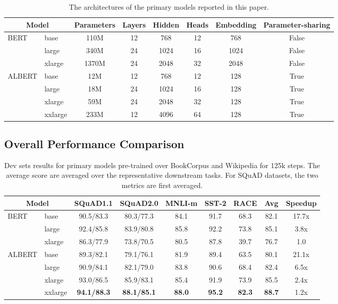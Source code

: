 \begin{table}
\small
\centering
\begin{tabular}{l  l | c c c c c c}
 \multicolumn{2}{c}{Model}  &Parameters	&Layers	&Hidden	& Heads	&Embedding &Parameter-sharing \\
\hline
\multirow{3}{*}{BERT}    &base	        &110M    &12 & 768  & 12 & 768 & False\\
    &large	        &340M	 &24 & 1024 & 16 & 1024 & False\\
    &xlarge	&1370M	 &24 & 2048 & 32 & 2048 & False\\
    \hline
\multirow{4}{*}{ALBERT}    &base	        &12M     &12 & 768  & 12 & 128 & True \\
    &large	        &18M	 &24 & 1024 & 16 & 128 & True\\
    &xlarge	&59M	 &24 & 2048 & 32 & 128 & True\\
    &xxlarge	&233M	 &12 & 4096 & 64 & 128 & True\\
\end{tabular}
\caption{The architectures of the primary models reported in this paper.}
\label{table:model_architecture}
\end{table}


\subsection{Overall Performance Comparison}
\label{overall-performance}

\begin{table}
\small
\centering
\begin{tabular}{ l l | c  c c c c c c}
 \multicolumn{2}{c}{Model}            	&SQuAD1.1	&SQuAD2.0	&MNLI-m	&SST-2	&RACE	&Avg & Speedup\\
\hline
\multirow{3}{*}{BERT} &base	          &90.5/83.3	&80.3/77.3	&84.1	&91.7	&68.3	&82.1 & 17.7x \\

    &large	        	&92.4/85.8	&83.9/80.8	&85.8	&92.2	&73.8	&85.1 & 3.8x\\
    &xlarge		&86.3/77.9	&73.8/70.5	&80.5	&87.8	&39.7	&76.7 & 1.0\\
\hline 
\multirow{4}{*}{ALBERT}  &base	        	    &89.3/82.1	&79.1/76.1	&81.9	&89.4	&63.5	&80.1 &21.1x \\
&large	        	    &90.9/84.1	&82.1/79.0	&83.8	&90.6	&68.4	&82.4 &6.5x\\
&xlarge		    &93.0/86.5	&85.9/83.1	&85.4	&91.9	&73.9	&85.5 & 2.4x\\
&xxlarge		& \textbf{94.1/88.3}	&\textbf{88.1/85.1}	&\textbf{88.0}	&\textbf{95.2}	&\textbf{82.3}	&\textbf{88.7} & 1.2x\\
\end{tabular}
\caption{Dev sets results for primary models pre-trained over BookCorpus and Wikipedia for 125k steps. The average score are averaged over the representative downstream tasks. For SQuAD datasets, the two metrics are first averaged.}
\label{table:overall_comparison}
\end{table}



